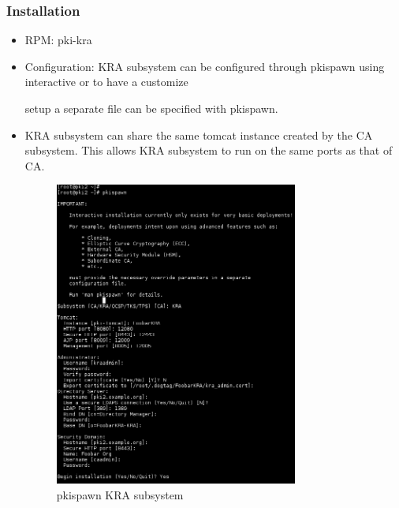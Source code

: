 \documentclass[a4paper]{article}
\begin{document}
\subsubsection{Installation}
\begin{itemize}
    \item RPM: pki-kra
    \item Configuration: KRA subsystem can be configured through pkispawn using interactive or to have a customize

        setup a separate file can be specified with pkispawn.

    \item KRA subsystem can share the same tomcat instance created by the CA subsystem. This allows KRA subsystem
        to run on the same ports as that of CA.

        \begin{figure}[H]
            \centering
            \includegraphics[width=80mm]{pkispawn-kra.png}
            \caption{pkispawn KRA subsystem}
        \end{figure}
\end{itemize}
\end{document}
